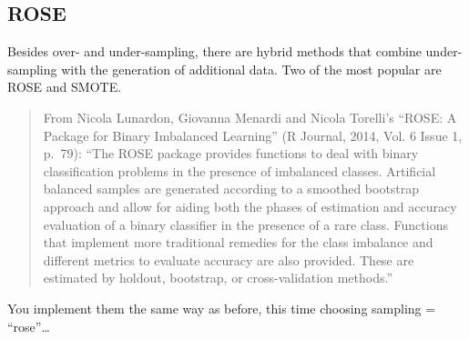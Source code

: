 \documentclass[]{book}
\newenvironment{Shaded}{\begin{snugshade}}{\end{snugshade}}
\newcommand{\CommentTok}[1]{\textcolor[rgb]{0.56,0.35,0.01}{\textit{#1}}}
\newcommand{\KeywordTok}[1]{\textcolor[rgb]{0.13,0.29,0.53}{\textbf{#1}}}
\newcommand{\NormalTok}[1]{#1}
\newcommand{\OperatorTok}[1]{\textcolor[rgb]{0.81,0.36,0.00}{\textbf{#1}}}
\newcommand{\StringTok}[1]{\textcolor[rgb]{0.31,0.60,0.02}{#1}}
\begin{document}
\begin{Shaded}
\end{Shaded}

\hypertarget{rose}{%
\subsection{ROSE}\label{rose}}

Besides over- and under-sampling, there are hybrid methods that combine under-sampling with the generation of additional data. Two of the most popular are ROSE and SMOTE.

\begin{quote}
From Nicola Lunardon, Giovanna Menardi and Nicola Torelli's ``ROSE: A Package for Binary Imbalanced Learning'' (R Journal, 2014, Vol. 6 Issue 1, p.~79): ``The ROSE package provides functions to deal with binary classification problems in the presence of imbalanced classes. Artificial balanced samples are generated according to a smoothed bootstrap approach and allow for aiding both the phases of estimation and accuracy evaluation of a binary classifier in the presence of a rare class. Functions that implement more traditional remedies for the class imbalance and different metrics to evaluate accuracy are also provided. These are estimated by holdout, bootstrap, or cross-validation methods.''
\end{quote}

You implement them the same way as before, this time choosing sampling = ``rose''\ldots{}
\end{document}
